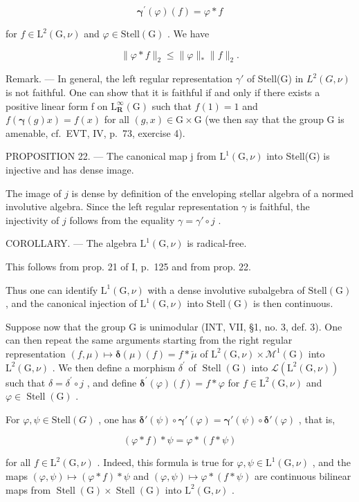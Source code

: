\[
\boldsymbol {\gamma} ^ {\prime} (\varphi) (f) = \varphi * f\tag{7}
\]

for \(f\in \mathrm{L}^2 (\mathrm{G},\nu)\) and \(\varphi \in \mathrm{Stell}(\mathrm{G})\) . We have

\[
\| \varphi * f \| _ {2} \leqslant \| \varphi \| _ {*} \| f \| _ {2}.\tag{8}
\]

Remark. --- In general, the left regular representation \(\gamma'\) of Stell(G) in \(L^{2}(G,\nu)\) is not faithful. One can show that it is faithful if and only if there exists a positive linear form f on \(\mathrm{L}_{\mathbf{R}}^{\infty}(\mathrm{G})\) such that \(f(1)=1\) and \(f(\boldsymbol{\gamma}(g)x)=f(x)\) for all \((g,x)\in\mathrm{G}\times\mathrm{G}\) (we then say that the group G is amenable, cf.~EVT, IV, p.~73, exercise 4).

PROPOSITION 22. --- The canonical map j from \(\mathrm{L}^{1}(\mathrm{G},\nu)\) into Stell(G) is injective and has dense image.

The image of \(j\) is dense by definition of the enveloping stellar algebra of a normed involutive algebra. Since the left regular representation \(\gamma\) is faithful, the injectivity of \(j\) follows from the equality \(\gamma = \gamma' \circ j\) .

COROLLARY. --- The algebra \(\mathrm{L}^{1}(\mathrm{G},\nu)\) is radical-free.

This follows from prop. 21 of I, p.~125 and from prop. 22.

Thus one can identify \(\mathrm{L}^{1}(\mathrm{G},\nu)\) with a dense involutive subalgebra of \(\mathrm{Stell}(\mathrm{G})\) , and the canonical injection of \(\mathrm{L}^{1}(\mathrm{G},\nu)\) into \(\mathrm{Stell}(\mathrm{G})\) is then continuous.

Suppose now that the group G is unimodular (INT, VII, §1, no. 3, def. 3). One can then repeat the same arguments starting from the right regular representation \((f,\mu)\mapsto\boldsymbol{\delta}(\mu)(f)=f*\breve{\mu}\) of \(\mathrm{L}^{2}(\mathrm{G},\nu)\times\mathcal{M}^{1}(\mathrm{G})\) into \(\mathrm{L}^{2}(\mathrm{G},\nu)\) . We then define a morphism \(\delta^{\prime}\) of \(\operatorname{Stell}(\mathrm{G})\) into \(\mathcal{L}(\mathrm{L}^{2}(\mathrm{G},\nu))\) such that \(\delta=\delta^{\prime}\circ j\) , and define \(\boldsymbol{\delta}^{\prime}(\varphi)(f)=f*\varphi\) for \(f\in\mathrm{L}^{2}(\mathrm{G},\nu)\) and \(\varphi\in\operatorname{Stell}(\mathrm{G})\) .

For \(\varphi, \psi \in \text{Stell}(G)\) , one has \(\boldsymbol{\delta}'(\psi) \circ \boldsymbol{\gamma}'(\varphi) = \boldsymbol{\gamma}'(\psi) \circ \boldsymbol{\delta}'(\varphi)\) , that is,

\[
(\varphi * f) * \psi = \varphi * (f * \psi)\tag{9}
\]

for all \(f \in \mathrm{L}^{2}(\mathrm{G}, \nu)\) . Indeed, this formula is true for \(\varphi, \psi \in \mathrm{L}^{1}(\mathrm{G}, \nu)\) , and the maps \((\varphi, \psi) \mapsto (\varphi * f) * \psi\) and \((\varphi, \psi) \mapsto \varphi * (f * \psi)\) are continuous bilinear maps from \(\operatorname{Stell}(\mathrm{G}) \times \operatorname{Stell}(\mathrm{G})\) into \(\mathrm{L}^{2}(\mathrm{G}, \nu)\) .


